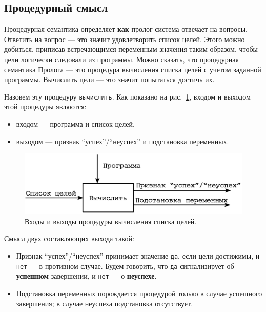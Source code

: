 \documentclass[12pt, openany, twoside]{book} %
\begin{document}
\subsection{Процедурный смысл}
Процедурная семантика определяет \textbf{как} пролог-система отвечает на вопросы. Ответить на вопрос --- это значит удовлетворить список целей. Этого можно добиться, приписав встречающимся переменным значения таким образом, чтобы цели логически следовали из программы. Можно сказать, что процедурная семантика Пролога --- это процедура вычисления списка целей с учетом заданной программы. Вычислить цели --- это значит попытаться достичь их.

Назовем эту процедуру \texttt{вычислить}. Как показано на рис.~\ref{pic:proc}, входом и выходом этой процедуры являются:
\begin{itemize}
\item[] входом --- программа и список целей,
\item[] выходом --- признак ``успех''/``неуспех'' и подстановка переменных.
\end{itemize}

\begin{figure}[h]
\begin{center}
\includegraphics[scale=0.7]{pics/imp_proc.eps}
\end{center}
\caption{Входы и выходы процедуры вычисления списка целей.}
\label{pic:proc}
\end{figure}

\noindent Смысл двух составляющих выхода такой:
\begin{itemize}
\item[(1)] Признак ``успех''/``неуспех'' принимает значение {\tt да}, если цели достижимы, и {\tt нет} --- в противном случае. Будем говорить, что {\tt да} сигнализирует об {\bf успешном} завершении, и {\tt нет} --- о {\bf неуспехе}.

\item[(2)] Подстановка переменных порождается процедурой только в случае успешного завершения; в случае неуспеха подстановка отсутствует.
\end{itemize}
\end{document}
